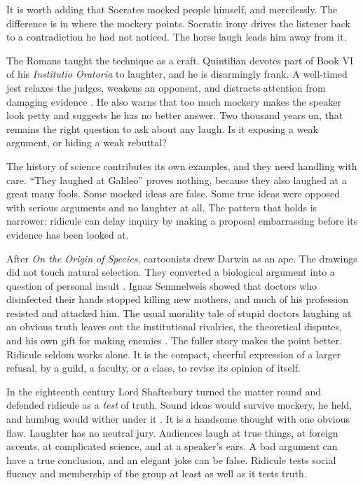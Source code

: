 \documentclass[12pt,a4paper]{book}
\begin{document}
It is worth adding that Socrates mocked people himself, and mercilessly. The difference is in where the mockery points. Socratic irony drives the listener back to a contradiction he had not noticed. The horse laugh leads him away from it.

The Romans taught the technique as a craft. Quintilian devotes part of Book VI of his \emph{Institutio Oratoria} to laughter, and he is disarmingly frank. A well-timed jest relaxes the judges, weakens an opponent, and distracts attention from damaging evidence \cite{quintilian1920}. He also warns that too much mockery makes the speaker look petty and suggests he has no better answer. Two thousand years on, that remains the right question to ask about any laugh. Is it exposing a weak argument, or hiding a weak rebuttal?

The history of science contributes its own examples, and they need handling with care. ``They laughed at Galileo'' proves nothing, because they also laughed at a great many fools. Some mocked ideas are false. Some true ideas were opposed with serious arguments and no laughter at all. The pattern that holds is narrower: ridicule can delay inquiry by making a proposal embarrassing before its evidence has been looked at.

After \emph{On the Origin of Species}, cartoonists drew Darwin as an ape. The drawings did not touch natural selection. They converted a biological argument into a question of personal insult \cite{darwinproject2024}. Ignaz Semmelweis showed that doctors who disinfected their hands stopped killing new mothers, and much of his profession resisted and attacked him. The usual morality tale of stupid doctors laughing at an obvious truth leaves out the institutional rivalries, the theoretical disputes, and his own gift for making enemies \cite{semmelweis2024}. The fuller story makes the point better. Ridicule seldom works alone. It is the compact, cheerful expression of a larger refusal, by a guild, a faculty, or a class, to revise its opinion of itself.

In the eighteenth century Lord Shaftesbury turned the matter round and defended ridicule as a \emph{test} of truth. Sound ideas would survive mockery, he held, and humbug would wither under it \cite{shaftesbury2024}. It is a handsome thought with one obvious flaw. Laughter has no neutral jury. Audiences laugh at true things, at foreign accents, at complicated science, and at a speaker's ears. A bad argument can have a true conclusion, and an elegant joke can be false. Ridicule tests social fluency and membership of the group at least as well as it tests truth.
\end{document}
